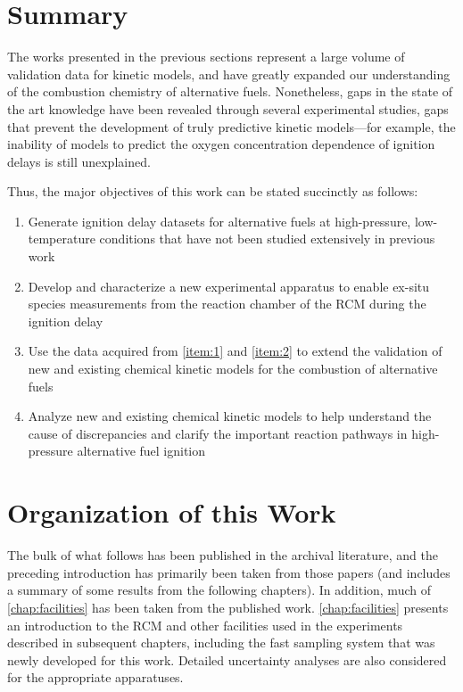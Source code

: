 \documentclass[../main.tex]{subfiles}
\begin{document}
\section{Summary}

The works presented in the previous sections represent a large volume
of validation data for kinetic models, and have greatly expanded our
understanding of the combustion chemistry of alternative fuels.
Nonetheless, gaps in the state of the art knowledge have been revealed
through several experimental studies, gaps that prevent the development
of truly predictive kinetic models---for example, the inability of
models to predict the oxygen concentration dependence of ignition delays
is still unexplained.

Thus, the major objectives of this work can be stated succinctly as
follows:

\begin{enumerate}
\item \label{item:1} Generate ignition delay datasets for alternative
fuels at high-pressure, low-temperature conditions that have not been
studied extensively in previous work

\item \label{item:2} Develop and characterize a new experimental
apparatus to enable ex-situ species measurements from the reaction
chamber of the RCM during the ignition delay

\item Use the data acquired from \cref{item:1} and \cref{item:2}
to extend the validation of new and existing chemical kinetic models
for the combustion of alternative fuels

\item Analyze new and existing chemical kinetic models to help
understand the cause of discrepancies and clarify the important
reaction pathways in high-pressure alternative fuel ignition
\end{enumerate}

\section{Organization of this Work}

The bulk of what follows has been published in the archival literature,
and the preceding introduction has primarily been taken from those
papers (and includes a summary of some results from the following
chapters). In addition, much of \cref{chap:facilities} has been
taken from the published work. \cref{chap:facilities} presents an
introduction to the RCM and other facilities used in the experiments
described in subsequent chapters, including the fast sampling system
that was newly developed for this work. Detailed uncertainty analyses
are also considered for the appropriate apparatuses.
\end{document}
